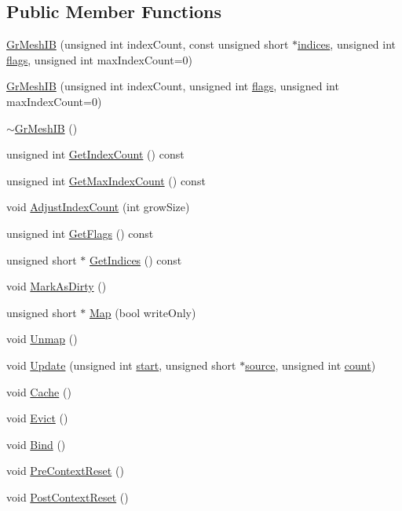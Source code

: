 \subsection*{Public Member Functions}
\begin{CompactItemize}
\item 
\hyperlink{class_gr_mesh_i_b_ccc1bb85f10260956c3adeb2f005ee8a}{GrMeshIB} (unsigned int indexCount, const unsigned short $\ast$\hyperlink{glext__bak_8h_c4293d0f76770fe857be3431df25308d}{indices}, unsigned int \hyperlink{_u_t_message_8h_0a3c0b351ab09281b662a9ff4f900a53}{flags}, unsigned int maxIndexCount=0)
\item 
\hyperlink{class_gr_mesh_i_b_567dd8e750f69193e29e62803625c917}{GrMeshIB} (unsigned int indexCount, unsigned int \hyperlink{_u_t_message_8h_0a3c0b351ab09281b662a9ff4f900a53}{flags}, unsigned int maxIndexCount=0)
\item 
\hyperlink{class_gr_mesh_i_b_6d29901b0246caa72ff0afa79abfc908}{$\sim$GrMeshIB} ()
\item 
unsigned int \hyperlink{class_gr_mesh_i_b_bc4d48c0654e6fef9dd839470e3acb1e}{GetIndexCount} () const 
\item 
unsigned int \hyperlink{class_gr_mesh_i_b_d87b87ba3f6eed6bbbf771f6209ffa25}{GetMaxIndexCount} () const 
\item 
void \hyperlink{class_gr_mesh_i_b_70b4040ac60faf6d940fb8d8c99742a5}{AdjustIndexCount} (int growSize)
\item 
unsigned int \hyperlink{class_gr_mesh_i_b_2742f129215e216397af17d54d7f30e9}{GetFlags} () const 
\item 
unsigned short $\ast$ \hyperlink{class_gr_mesh_i_b_b4046ea06d52f723bcbe47f3bf6e144a}{GetIndices} () const 
\item 
void \hyperlink{class_gr_mesh_i_b_717553e324aa83599fdbcde6a6a3f0d3}{MarkAsDirty} ()
\item 
unsigned short $\ast$ \hyperlink{class_gr_mesh_i_b_120496ea14cb6167d0f18e72fe69287e}{Map} (bool writeOnly)
\item 
void \hyperlink{class_gr_mesh_i_b_8151cb6061c284305d8c99c091216bdd}{Unmap} ()
\item 
void \hyperlink{class_gr_mesh_i_b_86bca7ecd874edc1a9dff554efbbec28}{Update} (unsigned int \hyperlink{glext__bak_8h_c55adc720a3098c1b454d2a4647f4361}{start}, unsigned short $\ast$\hyperlink{glext__bak_8h_fd3b198d09b41a863127e5e2b29c4e53}{source}, unsigned int \hyperlink{wglext_8h_98d18d6b4e3ba4ed266c6fb54c839d70}{count})
\item 
void \hyperlink{class_gr_mesh_i_b_2052ec71d1396ccc8ae46fc24d1ad3d3}{Cache} ()
\item 
void \hyperlink{class_gr_mesh_i_b_eb54e94dcc677dc3e11388a9748dca1c}{Evict} ()
\item 
void \hyperlink{class_gr_mesh_i_b_511e7b534dbd0745e34ed4957eccd527}{Bind} ()
\item 
void \hyperlink{class_gr_mesh_i_b_ba75408bf6d0944191a4369bcfffb40a}{PreContextReset} ()
\item 
void \hyperlink{class_gr_mesh_i_b_715a2cf171015c9b2fa8077ed592b4d9}{PostContextReset} ()
\end{CompactItemize}
